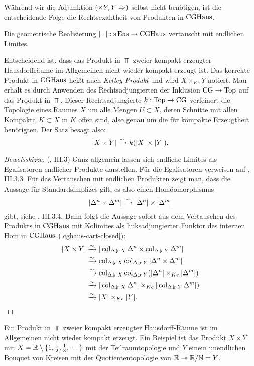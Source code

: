 Während wir die Adjunktion $(\times Y, Y \Rightarrow)$ selbst nicht
benötigen, ist die entscheidende Folge die Rechtsexaktheit von
Produkten in $\operatorname{CGHaus}$.
\begin{satz} \label{real-products}
  Die geometrische Realisierung $|\cdot|: \operatorname{s}\operatorname{Ens} \to \operatorname{CGHaus}$
  vertauscht mit endlichen Limites.
\end{satz}
\begin{bem}
   Entscheidend ist, dass das Produkt in $\Top$ zweier kompakt
   erzeugter Hausdorffräume im Allgemeinen nicht wieder kompakt
   erzeugt ist. Das korrekte Produkt in $\operatorname{CGHaus}$ heißt auch
   \emph{Kelley-Produkt} und wird $X \times_{Ke} Y$ notiert. Man
   erhält es durch Anwenden des Rechtsadjungierten der Inklusion $\operatorname{CG}
   \to \operatorname{Top}$ auf das Produkt in $\Top$. Dieser Rechtsadjungierte $k:
   \operatorname{Top} \to \operatorname{CG}$ verfeinert die Topologie eines Raumes $X$ um alle
   Mengen $U \subset X$, deren Schnitte mit allen Kompakta $K \subset
   X$ in $K$ offen sind, also genau um die für kompakte Erzeugtheit
   benötigten. Der Satz besagt also:
   \[ |X \times Y| \xrightarrow[]{\sim} k(|X| \times |Y|). \]
\end{bem}
\begin{proof}[Beweisskizze](\cite{Gabriel-Zisman}, III.3)
   Ganz allgemein lassen sich endliche Limites als Egalisatoren
   endlicher Produkte darstellen. Für die Egalisatoren verweisen auf
   \cite{Gabriel-Zisman}, III.3.3. Für das Vertauschen mit endlichen
   Produkten zeigt man, dass die Aussage für Standardsimplizes gilt,
   es also einen Homöomorphismus
   \[ |\Delta^n \times \Delta^m| \xrightarrow[]{\sim} |\Delta^n| \times |\Delta^m| \]
   gibt, siehe \cite{Gabriel-Zisman}, III.3.4. Dann folgt die Aussage
   sofort aus dem Vertauschen des Produkts in $\operatorname{CGHaus}$ mit Kolimites
   als linksadjungierter Funktor des internen Hom in $\operatorname{CGHaus}$
   (\ref{cghaus-cart-closed}):
   \begin{align*}
     |X \times Y|
     &\iso |\col_{\slicecat{\Delta}{r}{X}} \Delta^n \times
     \col_{\slicecat{\Delta}{r}{Y}} \Delta^m| \\
     &\iso \col_{\slicecat{\Delta}{r}{X}} \col_{\slicecat{\Delta}{r}{Y}}
     |\Delta^n \times \Delta^m| \\
     &\iso \col_{\slicecat{\Delta}{r}{X}} \col_{\slicecat{\Delta}{r}{Y}}
     (|\Delta^n| \times_{Ke} |\Delta^m|) \\
     &\iso |\col_{\slicecat{\Delta}{r}{X}} \Delta^n|
     \times_{Ke} |\col_{\slicecat{\Delta}{r}{Y}} \Delta^m|) \\
     &\iso |X| \times_{Ke} |Y|.
   \end{align*}
\end{proof}
\begin{bsp} \label{ex:cg-products}
  Ein Produkt in $\Top$ zweier kompakt erzeugter Hausdorff-Räume ist
  im Allgemeinen nicht wieder kompakt erzeugt. Ein Beispiel ist das
  Produkt $X \times Y$ mit $X = \mathbb{R} \setminus \{1, \frac{1}{2},
  \frac{1}{3}, \cdots \}$ mit der Teilraumtopologie und $Y$ einem
  unendlichen Bouquet von Kreisen mit der Quotiententopologie von $\mathbb{R}
  \twoheadrightarrow \mathbb{R}/\mathbb{N} = Y$.
\end{bsp}


